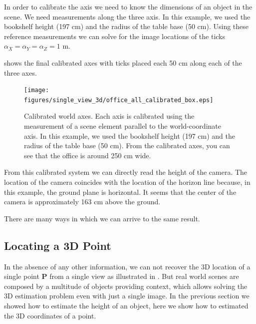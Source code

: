 In order to calibrate the axis we need to know the dimensions of an object in the scene. We need measurements along the three axis. In this example, we used the bookshelf height (197 cm) and the radius of the table base (50 cm). Using these reference measurements we can 
solve for the image locations of the ticks $\alpha_X=\alpha_Y=\alpha_Z=1$ m. 

\Fig{\ref{fig:office_all_calibrated_box}} shows the final calibrated axes with ticks placed each 50 cm along each of the three axes.  




\begin{figure}[t]
\centerline{
\texttt{[image: figures/single\_view\_3d/office\_all\_calibrated\_box.eps]}
} 
\caption{Calibrated world axes. Each axis is calibrated using the measurement of a scene element parallel to the world-coordinate axis. In this example, we used the bookshelf height (197 cm) and the radius of the table base (50 cm). From the calibrated axes, you can see that the office is around 250 cm wide.}
\label{fig:office_all_calibrated_box}
\end{figure}

From this calibrated system we can directly read the height of the camera. The location of the camera coincides with the location of the horizon line because, in this example, the ground plane is horizontal. It seems that the center of the camera is approximately 163 cm above the ground.


There are many ways in which we can arrive to the same result. 


\subsection{Locating a 3D Point}



In the absence of any other information, we can not recover the 3D location of a single point $\mathbf{P}$ from a single view as illustrated in . But real world scenes are composed by a multitude of objects providing context, which allows solving the 3D estimation problem even with just a single image. In the previous section we showed how to estimate the height of an object, here we show how to estimated the 3D coordinates of a point. 


